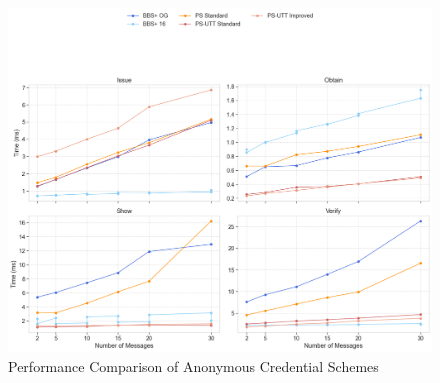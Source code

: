 \begin{figure}
    \centering
    \includegraphics[width=1\linewidth]{comparison-line-graph.png}
    \caption{Performance Comparison of Anonymous Credential Schemes}
    \label{fig:enter-label}
\end{figure}

